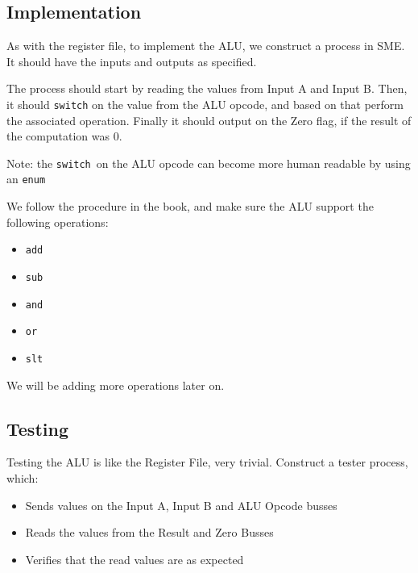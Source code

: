 \documentclass{beamer}
\begin{document}
\subsection{Implementation}
\begin{frame}
    As with the register file, to implement the ALU, we construct a process in
    SME. It should have the inputs and outputs as specified.

    \vspace{\baselineskip}
    The process should start by reading the values from Input A and Input B.
    Then, it should \texttt{switch} on the value from the ALU opcode, and based
    on that perform the associated operation. Finally it should output on the
    Zero flag, if the result of the computation was 0.

    \vspace{\baselineskip}
    Note: the \texttt{switch} on the ALU opcode can become more human readable
    by using an \texttt{enum}
\end{frame}
\begin{frame}
    We follow the procedure in the book, and make sure the ALU support the
    following operations:
    \begin{itemize}
        \item \texttt{add}
        \item \texttt{sub}
        \item \texttt{and}
        \item \texttt{or}
        \item \texttt{slt}
    \end{itemize}
    We will be adding more operations later on.
\end{frame}
\subsection{Testing}
\begin{frame}
    Testing the ALU is like the Register File, very trivial. Construct a tester
    process, which:
    \begin{itemize}
        \item Sends values on the Input A, Input B and ALU Opcode busses
        \item Reads the values from the Result and Zero Busses
        \item Verifies that the read values are as expected
    \end{itemize}
\end{frame}
\end{document}
